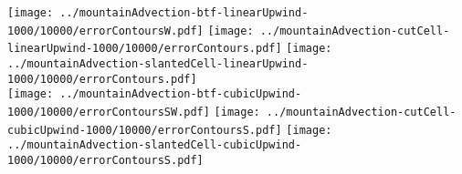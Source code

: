 \documentclass{article}
\begin{document}
\texttt{[image: ../mountainAdvection-btf-linearUpwind-1000/10000/errorContoursW.pdf]}
\hspace*{0.26em}
\texttt{[image: ../mountainAdvection-cutCell-linearUpwind-1000/10000/errorContours.pdf]}
\hspace*{0.26em}
\texttt{[image: ../mountainAdvection-slantedCell-linearUpwind-1000/10000/errorContours.pdf]} \\
\texttt{[image: ../mountainAdvection-btf-cubicUpwind-1000/10000/errorContoursSW.pdf]}
\texttt{[image: ../mountainAdvection-cutCell-cubicUpwind-1000/10000/errorContoursS.pdf]}
\texttt{[image: ../mountainAdvection-slantedCell-cubicUpwind-1000/10000/errorContoursS.pdf]}
\end{document}
